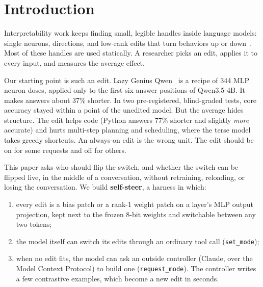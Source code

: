 \section{Introduction}

Interpretability work keeps finding small, legible handles inside language models: single neurons, directions, and low-rank edits that turn behaviors up or down~\cite{turner2023actadd,rimsky2023caa,zou2023repe}. Most of these handles are used statically. A researcher picks an edit, applies it to every input, and measures the average effect.

Our starting point is such an edit. Lazy Genius Qwen~\cite{lazygenius} is a recipe of 344 MLP neuron doses, applied only to the first six answer positions of Qwen3.5-4B. It makes answers about 37\% shorter. In two pre-registered, blind-graded tests, core accuracy stayed within a point of the unedited model. But the average hides structure. The edit helps code (Python answers 77\% shorter and slightly \emph{more} accurate) and hurts multi-step planning and scheduling, where the terse model takes greedy shortcuts. An always-on edit is the wrong unit. The edit should be on for some requests and off for others.

This paper asks who should flip the switch, and whether the switch can be flipped live, in the middle of a conversation, without retraining, reloading, or losing the conversation. We build \textbf{self-steer}, a harness in which:
\begin{enumerate}
\item every edit is a bias patch or a rank-1 weight patch on a layer's MLP output projection, kept next to the frozen 8-bit weights and switchable between any two tokens;
\item the model itself can switch its edits through an ordinary tool call (\texttt{set\_mode});
\item when no edit fits, the model can ask an outside controller (Claude, over the Model Context Protocol) to build one (\texttt{request\_mode}). The controller writes a few contrastive examples, which become a new edit in seconds.
\end{enumerate}

